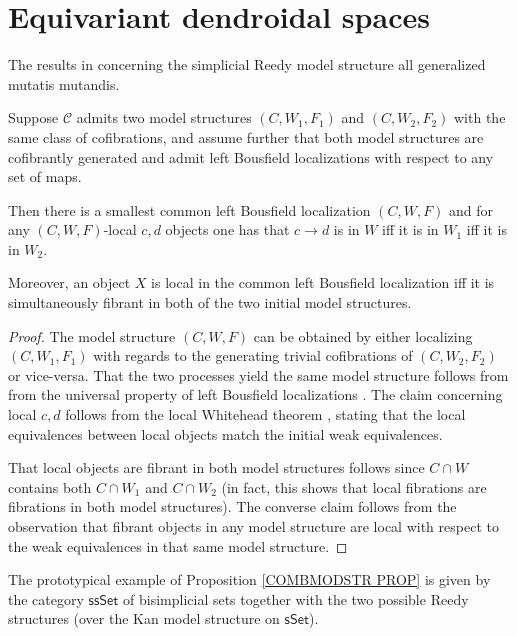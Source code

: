 \documentclass[a4paper,10pt,draft]{article}%
\begin{document}
\section{Equivariant dendroidal spaces}

The results in \cite[\S 4]{CM13a}
concerning the simplicial Reedy model structure all generalized mutatis mutandis.

\begin{proposition}\label{COMBMODSTR PROP}
	Suppose $\mathcal{C}$
	admits two model structures $(C,W_1,F_1)$ and $(C,W_2,F_2)$
	with the same class of cofibrations, and assume further that both model structures are cofibrantly generated and admit left Bousfield localizations with respect to any set of maps.
	
	Then there is a smallest common left Bousfield localization 
	$(C,W,F)$ and for any $(C,W,F)$-local 
	$c,d$ objects one has that $c\to d$ is in $W$ iff it is in $W_1$ iff it is in $W_2$.
	
	Moreover, an object $X$ is local in the common left Bousfield localization iff it is simultaneously fibrant in both of the two initial model structures.
\end{proposition}

\begin{proof}
	The model structure $(C,W,F)$ can be obtained by either localizing $(C,W_1,F_1)$ with regards to the generating trivial cofibrations of $(C,W_2,F_2)$ or vice-versa. That the two processes yield the same model structure follows from from the universal property of left Bousfield localizations \cite[Prop. 3.4.18]{Hir03}.
	The claim concerning local $c,d$ follows from the local Whitehead theorem \cite[Thm. 3.3.8]{Hir03}, stating that
the local equivalences between local objects match the
initial weak equivalences.

That local objects are fibrant in both model structures follows since $C \cap W$ contains both $C \cap W_1$ and $C\cap W_2$ (in fact, this shows that local fibrations are fibrations in both model structures). The converse claim follows from the observation that fibrant objects in any model structure are local with respect to the weak equivalences in that same model structure.
\end{proof}

The prototypical example of Proposition \ref{COMBMODSTR PROP}
is given by the category $\mathsf{ssSet}$ of bisimplicial sets together with the two possible Reedy structures (over the Kan model structure on $\mathsf{sSet}$).
\end{document}
